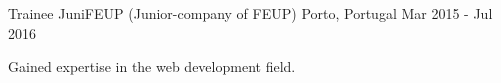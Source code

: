 
\begin{cventries}
  \cventry
    {Trainee} %
    {JuniFEUP (Junior-company of FEUP)} %
    {Porto, Portugal} %
    {Mar 2015 - Jul 2016} %
    {
      \begin{cvitems} %
        \item {Gained expertise in the web development field.}
      \end{cvitems}
    }
\end{cventries}

